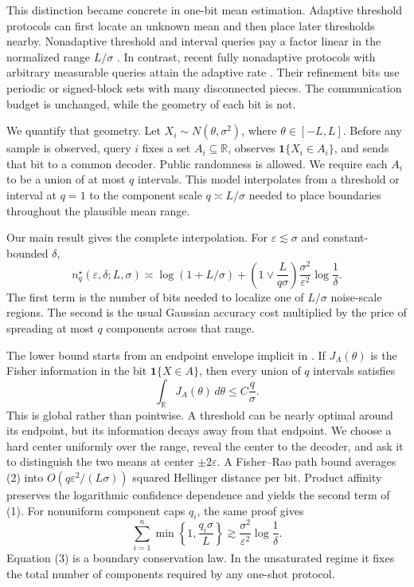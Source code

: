 \documentclass{article}
\theoremstyle{definition}
\theoremstyle{remark}
\newcommand{\R}{\mathbb R}
\newcommand{\1}{\mathbf 1}
\begin{document}
This distinction became concrete in one-bit mean estimation. Adaptive threshold protocols can first locate an unknown mean and then place later thresholds nearby. Nonadaptive threshold and interval queries pay a factor linear in the normalized range \(L/\sigma\) \citep{lau2026order}. In contrast, recent fully nonadaptive protocols with arbitrary measurable queries attain the adaptive rate \citep{miao2026universal,hu2026interaction}. Their refinement bits use periodic or signed-block sets with many disconnected pieces. The communication budget is unchanged, while the geometry of each bit is not.

We quantify that geometry. Let \(X_i\sim N(\theta,\sigma^2)\), where \(\theta\in[-L,L]\). Before any sample is observed, query \(i\) fixes a set \(A_i\subseteq\R\), observes \(\1\{X_i\in A_i\}\), and sends that bit to a common decoder. Public randomness is allowed. We require each \(A_i\) to be a union of at most \(q\) intervals. This model interpolates from a threshold or interval at \(q=1\) to the component scale \(q\asymp L/\sigma\) needed to place boundaries throughout the plausible mean range.

Our main result gives the complete interpolation. For \(\varepsilon\lesssim\sigma\) and constant-bounded \(\delta\), \[ n_q^\star(\varepsilon,\delta;L,\sigma) \asymp \log(1+L/\sigma) + \left(1\vee\frac{L}{q\sigma}\right) \frac{\sigma^2}{\varepsilon^2}\log\frac1\delta . \tag{1} \] The first term is the number of bits needed to localize one of \(L/\sigma\) noise-scale regions. The second is the usual Gaussian accuracy cost multiplied by the price of spreading at most \(q\) components across that range.

The lower bound starts from an endpoint envelope implicit in \citet{kipnis2022mean}. If \(J_A(\theta)\) is the Fisher information in the bit \(\1\{X\in A\}\), then every union of \(q\) intervals satisfies \[ \int_{\R}J_A(\theta)\,d\theta\leq C\frac q\sigma . \tag{2} \] This is global rather than pointwise. A threshold can be nearly optimal around its endpoint, but its information decays away from that endpoint. We choose a hard center uniformly over the range, reveal the center to the decoder, and ask it to distinguish the two means at center \(\pm2\varepsilon\). A Fisher--Rao path bound averages (2) into \(O(q\varepsilon^2/(L\sigma))\) squared Hellinger distance per bit. Product affinity preserves the logarithmic confidence dependence and yields the second term of (1). For nonuniform component caps \(q_i\), the same proof gives \[ \sum_{i=1}^n\min\left\{1,\frac{q_i\sigma}{L}\right\} \gtrsim \frac{\sigma^2}{\varepsilon^2}\log\frac1\delta . \tag{3} \] Equation (3) is a boundary conservation law. In the unsaturated regime it fixes the total number of components required by any one-shot protocol.
\end{document}
